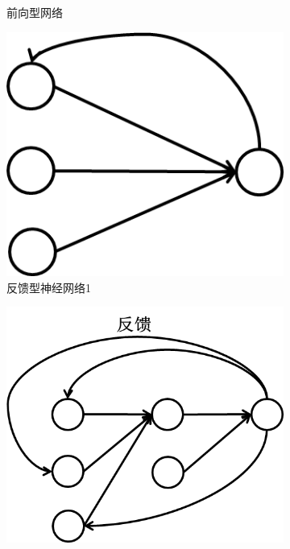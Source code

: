 {\begin{figure}[H]
\begin{subfigure}[b]{0.2\textwidth}
        			\caption{前向型网络}
        			\label{fig:前向型网络}
    			\end{subfigure}
    			\quad
    			\begin{subfigure}[b]{0.2\textwidth}
        			\includegraphics[width=\textwidth]{images/feedback_network2.jpg}
        			\caption{反馈型神经网络1}
        			\label{fig:反馈型神经网络1}
    			\end{subfigure}
    			\quad
    			\begin{subfigure}[b]{0.25\textwidth}
        			\includegraphics[width=\textwidth]{images/feedback_network3.jpg}

\end{subfigure}
\end{figure}}
